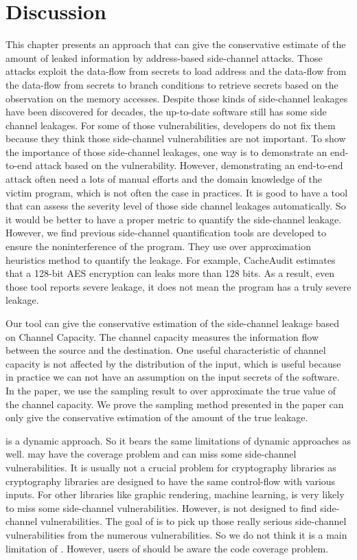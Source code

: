 \section{Discussion}

This chapter presents an approach that can give the conservative estimate of the amount of leaked information by address-based side-channel attacks. Those attacks exploit the data-flow from secrets to load address and the data-flow from the data-flow from secrets to branch conditions to retrieve secrets based on the observation on the memory accesses. Despite those kinds of side-channel leakages have been discovered for decades, the up-to-date software still has some side channel leakages. For some of those vulnerabilities, developers do not fix them because they think those side-channel vulnerabilities are not important. To show the importance of those side-channel leakages, one way is to demonstrate an end-to-end attack based on the vulnerability. However, demonstrating an end-to-end attack often need a lots of manual efforts and the domain knowledge of the victim program, which is not often the case in practices. It is good to have a tool that can assess the severity level of those side channel leakages automatically. So it would be better to have a proper metric to quantify the side-channel leakage. However, we find previous side-channel quantification tools are developed to  ensure the noninterference of the program. They use over approximation heuristics method to quantify the leakage. For example, CacheAudit estimates that a 128-bit AES encryption can leaks more than 128 bits. As a result, even those tool reports severe leakage, it does not mean the program has a truly severe leakage.

Our tool can give the conservative estimation of the side-channel leakage based on Channel Capacity. The channel capacity measures  the information flow between the source and the destination. One useful characteristic of channel capacity is not affected by the distribution of the input, which is useful because in practice we can not have an assumption on the input secrets of the software. In the paper, we use the sampling result to over approximate the true value of the channel capacity. We prove the sampling method presented in the paper can only give the conservative estimation of the amount of the true leakage.

\ctool{} is a dynamic approach. So it bears the same limitations of dynamic approaches as well. \ctool{} may have the coverage problem and can miss some side-channel vulnerabilities. It is usually not a crucial problem for cryptography libraries as cryptography libraries are designed to have the same control-flow with various inputs. For other libraries like graphic rendering, machine learning, \ctool{} is very likely to miss some side-channel vulnerabilities. However, \ctool{} is not designed to find side-channel vulnerabilities. The goal of \ctool{} is to pick up those really serious side-channel vulnerabilities from the numerous vulnerabilities. So we do not think it is a main limitation of \ctool{}. However, users of \ctool{} should be aware the code coverage problem.

